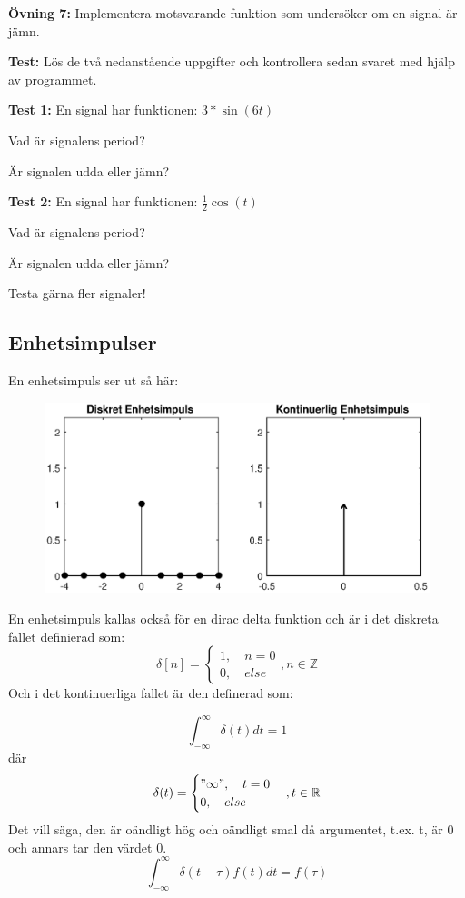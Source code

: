 \documentclass{article}
\begin{document}
\textbf{Övning 7:} Implementera motsvarande funktion som undersöker
om en signal är jämn.

\textbf{Test:} Lös de två nedanstående uppgifter och kontrollera sedan svaret med
hjälp av programmet.

\textbf{Test 1:}
En signal har funktionen: $3*\sin(6t)$

Vad är signalens period?

Är signalen udda eller jämn?

\textbf{Test 2:}
En signal har funktionen: $\frac{1}{2} \cos(t)$

Vad är signalens period?

Är signalen udda eller jämn?

Testa gärna fler signaler!

\subsection{Enhetsimpulser}
En enhetsimpuls ser ut så här:


\begin{figure}[ht]
\centerline{\includegraphics[scale=0.50]{delta.eps}}

\caption{}
\label{}
\end{figure}

En enhetsimpuls kallas också för en dirac delta funktion och är i det
diskreta fallet definierad som:
$$
\delta[n]=
\begin{cases}
    1,\quad n = 0 \\
    0, \quad else
\end{cases}, n \in \mathbb{Z}
$$
Och i det kontinuerliga fallet är den definerad som:

$$\int_{-\infty}^{\infty} \delta(t) dt = 1 $$
där
$$
\delta(t)=
\begin{cases}
"\infty",\quad t = 0 \\
0, \quad else
\end{cases}, t\in \mathbb{R}
$$
Det vill säga, den är oändligt hög och oändligt smal då argumentet,
t.ex. t, är 0 och annars tar den värdet 0.
$$\int_{-\infty}^{\infty} \delta(t-\tau) f(t) dt = f(\tau) $$
\end{document}
